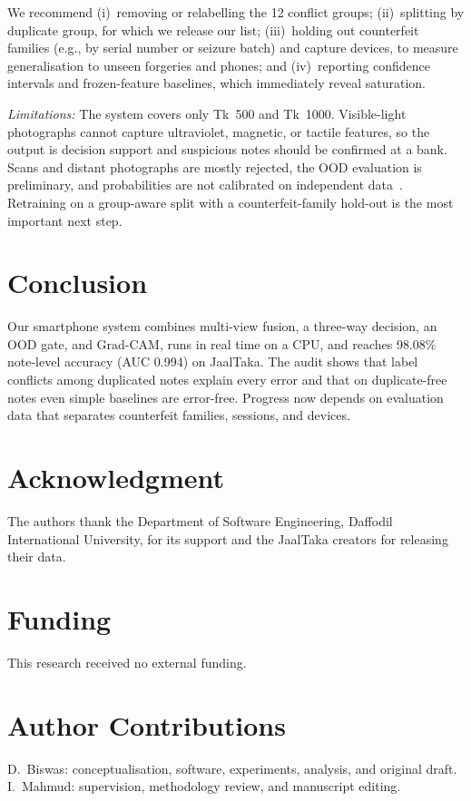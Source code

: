 \documentclass[journal,onecolumn]{IEEEtran}
\begin{document}
We recommend (i)~removing or relabelling the 12 conflict groups; (ii)~splitting by
duplicate group, for which we release our list; (iii)~holding out counterfeit families
(e.g., by serial number or seizure batch) and capture devices, to measure generalisation
to unseen forgeries and phones; and (iv)~reporting confidence intervals and
frozen-feature baselines, which immediately reveal saturation.

\textit{Limitations:} The system covers only Tk~500 and Tk~1000. Visible-light
photographs cannot capture ultraviolet, magnetic, or tactile features, so the output is
decision support and suspicious notes should be confirmed at a bank. Scans and distant
photographs are mostly rejected, the OOD evaluation is preliminary, and probabilities
are not calibrated on independent data~\cite{guo2017calibration}. Retraining on a
group-aware split with a counterfeit-family hold-out is the most important next step.

\section{Conclusion}
\label{sec:conclusion}

Our smartphone system combines multi-view fusion, a three-way decision, an OOD gate, and
Grad-CAM, runs in real time on a CPU, and reaches 98.08\% note-level accuracy (AUC 0.994)
on JaalTaka. The audit shows that label conflicts among duplicated notes explain every
error and that on duplicate-free notes even simple baselines are error-free. Progress now
depends on evaluation data that separates counterfeit families, sessions, and devices.

\section*{Acknowledgment}
The authors thank the Department of Software Engineering, Daffodil International
University, for its support and the JaalTaka creators for releasing their data.

\section*{Funding}
This research received no external funding.

\section*{Author Contributions}
D.~Biswas: conceptualisation, software, experiments, analysis, and original draft.
I.~Mahmud: supervision, methodology review, and manuscript editing.
\end{document}
